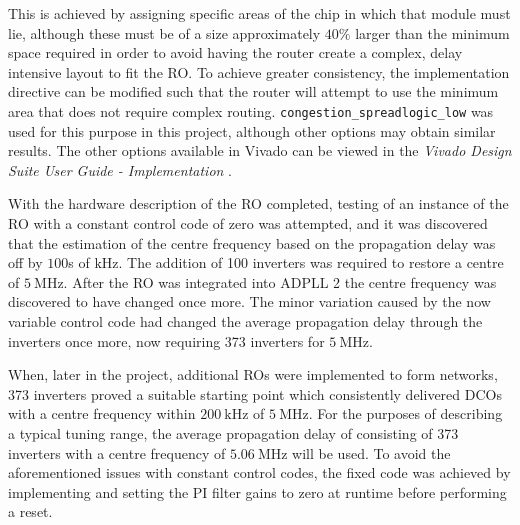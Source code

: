 This is achieved by assigning specific areas of the chip in which that module must lie, although these must be of a size approximately $40\%$ larger than the minimum space required in order to avoid having the router create a complex, delay intensive layout to fit the \ac{RO}. To achieve greater consistency, the implementation directive can be modified such that the router will attempt to use the minimum area that does not require complex routing. \texttt{congestion\_spreadlogic\_low} was used for this purpose in this project, although other options may obtain similar results. The other options available in Vivado can be viewed in the \textit{Vivado Design Suite User Guide - Implementation} \cite{impl_ug}.

With the hardware description of the \ac{RO} completed, testing of an instance of the \ac{RO} with a constant control code of zero was attempted, and it was discovered that the estimation of the centre frequency based on the propagation delay was off by $100$s of $\si{\kilo\hertz}$. The addition of 100 inverters was required to restore a centre of $5~\si{\mega\hertz}$. After the \ac{RO} was integrated into \ac{ADPLL} 2 the centre frequency was discovered to have changed once more. The minor variation caused by the now variable control code had changed the average propagation delay through the inverters once more, now requiring 373 inverters for $5~\si{\mega\hertz}$.

When, later in the project, additional \acp{RO} were implemented to form networks, 373 inverters proved a suitable starting point which consistently delivered \acp{DCO} with a centre frequency within $200~\si{\kilo\hertz}$ of $5~\si{\mega\hertz}$. For the purposes of describing a typical tuning range, the average propagation delay of  consisting of 373 inverters with a centre frequency of $5.06~\si{\mega\hertz}$ will be used. To avoid the aforementioned issues with constant control codes, the fixed code was achieved by implementing  and setting the \ac{PI} filter gains to zero at runtime before performing a reset.

